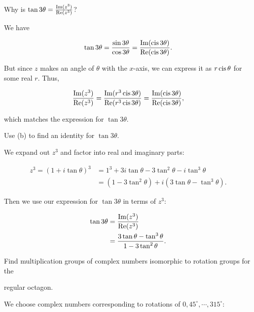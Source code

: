 \documentclass[../key.tex]{subfiles}
\begin{document}
\begin{inner_problem}
\item Why is $\tan 3\theta = \frac{\operatorname{Im}(z^3)}{\operatorname{Re}(z^3)}$?
\end{inner_problem}

We have

$$\tan 3\theta=\frac{\sin 3\theta}{\cos 3\theta}=\frac{\operatorname{Im}(\operatorname{cis} 3\theta)}{\operatorname{Re}(\operatorname{cis} 3\theta)}.$$

But since $z$ makes an angle of $\theta$ with the $x$-axis, we can express it as $r\operatorname{cis} \theta$ for some real $r$. Thus,

$$\frac{\operatorname{Im}(z^3)}{\operatorname{Re}(z^3)} = \frac{\operatorname{Im}(r^3 \operatorname{cis} 3\theta)}{\operatorname{Re}(r^3\operatorname{cis} 3\theta)} =\frac{\operatorname{Im}(\operatorname{cis} 3\theta)}{\operatorname{Re}(\operatorname{cis} 3\theta)},$$

which matches the expression for $\tan 3\theta$.

\begin{inner_problem}
\item Use (b) to find an identity for $\tan 3\theta$.
\end{inner_problem}

We expand out $z^3$ and factor into real and imaginary parts:

\begin{align*}
z^3 = (1+i\tan\theta)^3 &= 1^3 + 3i\tan\theta - 3\tan^2\theta - i\tan^3\theta \\
&= (1-3\tan^2\theta) + i(3\tan\theta - \tan^3\theta).
\end{align*}

Then we use our expression for $\tan 3\theta$ in terms of $z^3$:

\begin{align*}
\tan 3\theta &= \frac{\operatorname{Im}(z^3)}{\operatorname{Re}(z^3)} \\
&= \frac{3\tan\theta - \tan^3\theta}{1-3\tan^2\theta}.
\end{align*}

\begin{outer_problem}
\item Find multiplication groups of complex numbers isomorphic to rotation groups for the
\end{outer_problem}

\begin{inner_problem}[start=1]
\item regular octagon.
\end{inner_problem}

We choose complex numbers corresponding to rotations of $0,45^\circ, \cdots, 315^\circ$:
\end{document}
